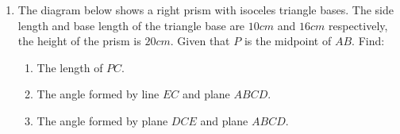 \documentclass{report}
\begin{document}
\begin{multicols}{2}
\begin{enumerate}
\begin{center}
              \end{center}
        \item The diagram below shows a right prism with isoceles triangle bases. The side
              length and base length of the triangle base are $10cm$ and $16cm$ respectively,
              the height of the prism is $20cm$. Given that $P$ is the midpoint of $AB$.
              Find:
              \begin{enumerate}
                  \item The length of $PC$.
                  \item The angle formed by line $EC$ and plane $ABCD$.
                  \item The angle formed by plane $DCE$ and plane $ABCD$.
              \end{enumerate}

    \end{enumerate}

\end{multicols}
\end{document}
